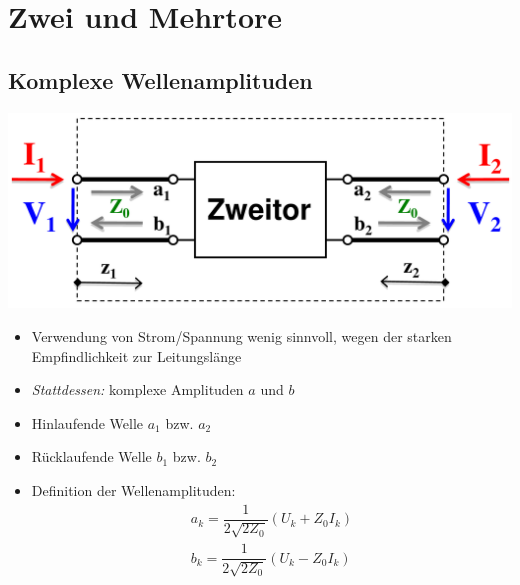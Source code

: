 \vspace{1cm}
\section{Zwei und Mehrtore}
\subsection{Komplexe Wellenamplituden}
\includegraphics[width= 0.35\paperheight]{content/fuw/pictures/hf_zweitor.png}
    \begin{itemize}
        \itemsep0pt
        \item Verwendung von Strom/Spannung wenig sinnvoll, wegen der starken Empfindlichkeit zur Leitungslänge
        \item \textit{Stattdessen:} komplexe Amplituden $a$ und $b$
        \item Hinlaufende Welle $a_1$ bzw. $a_2$
        \item Rücklaufende Welle $b_1$ bzw. $b_2$
        \item Definition der Wellenamplituden:
        \begin{align*}
            a_k  = \dfrac{1}{2\sqrt{2 Z_0}}(U_k + Z_0 I_k)\\
            b_k  = \dfrac{1}{2\sqrt{2 Z_0}}(U_k - Z_0 I_k)
        \end{align*}
\end{itemize}
